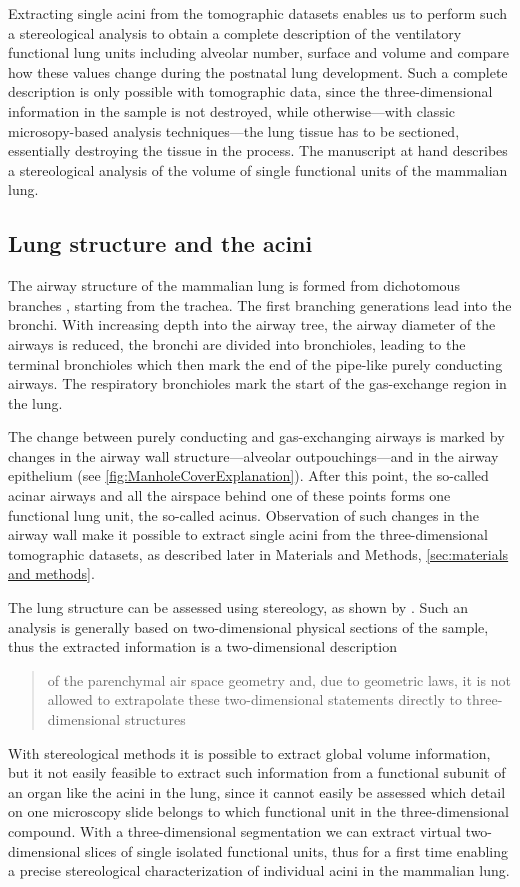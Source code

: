 \documentclass[%
	twoside,
	paper=a4,%
	abstract=true,%
	]{scrartcl}
\begin{document}
Extracting single acini from the tomographic datasets enables us to perform such a stereological analysis to obtain a complete description of the ventilatory functional lung units including alveolar number, surface and volume and compare how these values change during the postnatal lung development. Such a complete description is only possible with tomographic data, since the three-dimensional information in the sample is not destroyed, while otherwise---with classic microsopy-based analysis techniques---the lung tissue has to be sectioned, essentially destroying the tissue in the process. The manuscript at hand describes a stereological analysis of the volume of single functional units of the mammalian lung.

\subsection{Lung structure and the acini}
The airway structure of the mammalian lung is formed from dichotomous branches \cite{Weibel1991}, starting from the trachea. The first branching generations lead into the bronchi. With increasing depth into the airway tree, the airway diameter of the airways is reduced, the bronchi are divided into bronchioles, leading to the terminal bronchioles which then mark the end of the pipe-like purely conducting airways. The respiratory bronchioles mark the start of the gas-exchange region in the lung.

The change between purely conducting and gas-exchanging airways is marked by changes in the airway wall structure---alveolar outpouchings---and in the airway epithelium (see \autoref{fig:ManholeCoverExplanation}). After this point, the so-called acinar airways and all the airspace behind one of these points forms one functional lung unit, the so-called acinus. Observation of such changes in the airway wall make it possible to extract single acini from the three-dimensional tomographic datasets, as described later in Materials and Methods, \autoref{sec:materials and methods}.

The lung structure can be assessed using stereology, as shown by \citet{Hsia2010,Tschanz2002}. Such an analysis is generally based on two-dimensional physical sections of the sample, thus the extracted information is a two-dimensional description \blockquote[\cite{Tschanz2002}]{of the parenchymal air space geometry and, due to geometric laws, it is not allowed to extrapolate these two-dimensional statements directly to three-dimensional structures}. With stereological methods it is possible to extract global volume information, but it not easily feasible to extract such information from a functional subunit of an organ like the acini in the lung, since it cannot easily be assessed which detail on one microscopy slide belongs to which functional unit in the three-dimensional compound. With a three-dimensional segmentation we can extract virtual two-dimensional slices of single isolated functional units, thus for a first time enabling a precise stereological characterization of individual acini in the mammalian lung.
\end{document}
